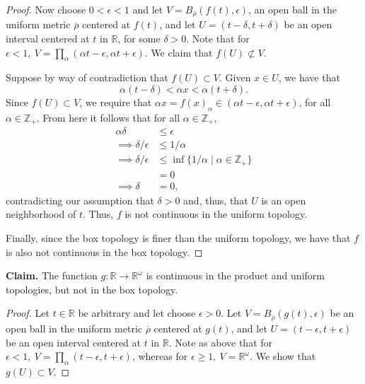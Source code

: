 \documentclass[a4paper,10pt]{article}
\newcommand{\ZZ}{\mathbb{Z}}
\newcommand{\RR}{\mathbb{R}}
\begin{document}
\begin{solution}
\begin{proof}
        Now choose $0 < \epsilon < 1$ and let $V = B_{\overline{\rho}}(f(t), \epsilon)$, an open ball in the uniform metric $\overline{\rho}$ centered at $f(t)$, and let $U = (t - \delta, t + \delta)$ be an open interval centered at $t$ in $\RR$, for some $\delta > 0$.
        Note that for $\epsilon < 1,~ V = \prod_\alpha (\alpha t - \epsilon, \alpha t + \epsilon)$.
        We claim that $f(U) \not\subset V$.

        Suppose by way of contradiction that $f(U) \subset V$.
        Given $x \in U$, we have that
        \begin{equation*}
            \alpha (t - \delta) < \alpha x < \alpha (t + \delta).
        \end{equation*}
        Since $f(U) \subset V$, we require that $\alpha x = f(x)_\alpha \in (\alpha t - \epsilon, \alpha t + \epsilon)$, for all $\alpha \in \ZZ_+$.
        From here it follows that for all $\alpha \in \ZZ_+$,
        \begin{align*}
            \alpha \delta               &\leq \epsilon \\
            \implies \delta / \epsilon  &\leq 1 / \alpha \\
            \implies \delta / \epsilon  &\leq \inf\{1 / \alpha \mid \alpha \in \ZZ_+\} \\
                                        &= 0 \\
            \implies \delta             &= 0,
        \end{align*}
        contradicting our assumption that $\delta > 0$ and, thus, that $U$ is an open neighborhood of $t$.
        Thus, $f$ is not continuous in the uniform topology.

        Finally, since the box topology is finer than the uniform topology, we have that $f$ is also not continuous in the box topology.
    \end{proof}
    \bigskip

    \noindent\textbf{Claim.} The function $g: \RR \rightarrow \RR^\omega$ is continuous in the product and uniform topologies, but not in the box topology.
    \begin{proof}
        Let $t \in \RR$ be arbitrary and let choose $\epsilon > 0$.
        Let $V = B_{\overline{\rho}}(g(t), \epsilon)$ be an open ball in the uniform metric $\overline{\rho}$ centered at $g(t)$, and let $U = (t - \epsilon, t + \epsilon)$ be an open interval centered at $t$ in $\RR$.
        Note as above that for $\epsilon < 1,~ V = \prod_\alpha (t - \epsilon, t + \epsilon)$, whereas for $\epsilon \geq 1,~ V = \RR^\omega$.
        We show that $g(U) \subset V$.


\end{proof}
\end{solution}
\end{document}

